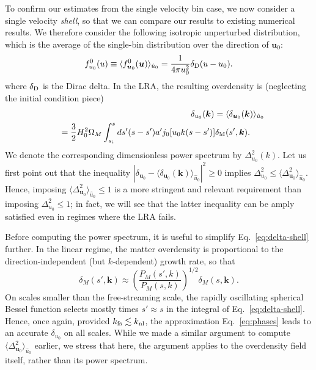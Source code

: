 \documentclass[useAMS, usenatbib]{mnras}
\newcommand{\beq}{\begin{equation}}
\newcommand{\eeq}{\end{equation}}
\newcommand{\barr}{\begin{eqnarray}}
\newcommand{\earr}{\end{eqnarray}}
\newcommand{\bs}{\boldsymbol}
\begin{document}
To confirm our estimates from the single velocity bin case, we now consider a single velocity \emph{shell}, so that we can compare our results to existing numerical results. We therefore consider the following isotropic unperturbed distribution, which is the average of the single-bin distribution over the direction of $\bs{u}_0$:
\beq
f^0_{u_0}(u) \equiv \langle f_{\bs{u}_0}^0 (\bs{u}) \rangle_{\hat{u}_0} = \frac1{4 \pi u_0^2} \delta_{\rm D}(u- u_0).
\eeq
where $\delta_{\rm D}$ is the Dirac delta. In the LRA, the resulting overdensity is (neglecting the initial condition piece)
\barr
&&\delta_{u_0}(\bs{k}) = \langle \delta_{\bs{u}_0}(\bs{k}) \rangle_{\hat{u}_0} \nonumber\\
&&= \frac32 H_0^2 \Omega_M \int_{s_i}^s ds' (s - s') a' j_0[u_0 k (s - s')] \delta_{\rm M}(s', \bs{k}).~~~~~ \label{eq:delta-shell}
\earr
We denote the corresponding dimensionless power spectrum by $\Delta^2_{u_0}(k)$. Let us first point out that the inequality $|\delta_{\bs{u}_0} - \langle \delta_{\bs{u}_0}(\bs{k}) \rangle_{\hat{u}_0}|^2 \geq 0$ implies $\Delta^2_{u_0} \leq \langle \Delta^2_{\bs{u}_0} \rangle_{\hat{u}_0}$. Hence, imposing $\langle \Delta^2_{\bs{u}_0} \rangle_{\hat{u}_0} \leq 1$ is a more stringent and relevant requirement than imposing $\Delta^2_{u_0} \leq 1$; in fact, we will see that the latter inequality can be amply satisfied even in regimes where the LRA fails.

Before computing the power spectrum, it is useful to simplify Eq.~\eqref{eq:delta-shell} further. In the linear regime, the matter overdensity is proportional to the direction-independent (but $k$-dependent) growth rate, so that
\beq
\delta_M(s', \bs{k}) \approx \left(\frac{P_M(s', k)}{P_M(s, k)}\right)^{1/2} \delta_M(s, \bs{k}). \label{eq:phases}
\eeq
On scales smaller than the free-streaming scale, the rapidly oscillating spherical Bessel function selects mostly times $s' \approx s$ in the integral of Eq.~\eqref{eq:delta-shell}. Hence, once again, provided $k_{\rm fs} \lesssim k_{\rm nl}$, the approximation Eq.~\eqref{eq:phases} leads to an accurate $\delta_{u_0}$ on all scales. While we made a similar argument to compute $\langle \Delta^2_{\bs{u}_0} \rangle_{\hat{u}_0}$ earlier, we stress that here, the argument applies to the overdensity field itself, rather than its power spectrum.
\end{document}
